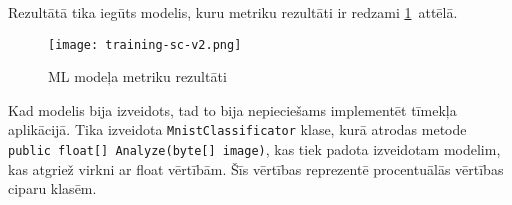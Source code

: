     Rezultātā tika iegūts modelis, kuru metriku rezultāti ir redzami \ref{ml:metrics}~attēlā.

    \begin{figure}[H]
        \centering
        \texttt{[image: training-sc-v2.png]}
        \caption{ML modeļa metriku rezultāti}
        \label{ml:metrics}
    \end{figure}

    Kad modelis bija izveidots, tad to bija nepieciešams implementēt tīmekļa aplikācijā. Tika izveidota
    \texttt{MnistClassificator} klase, kurā atrodas  metode \texttt{public float[] Analyze(byte[] image)}, kas tiek padota izveidotam modelim, kas atgriež
    virkni ar float vērtībām. Šīs vērtības reprezentē procentuālās vērtības ciparu klasēm.
